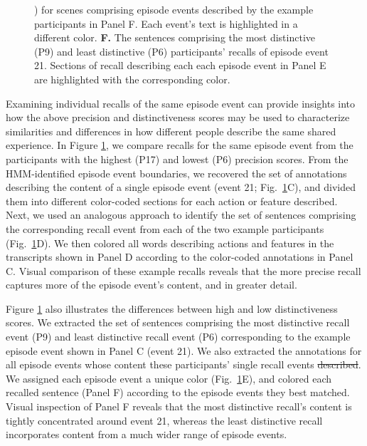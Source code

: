 \documentclass[10pt]{article}
\renewcommand{\includegraphics}[2][]{} %
\providecommand{\DIFaddtex}[1]{{\protect\color{blue}\uwave{#1}}} %
\providecommand{\DIFdeltex}[1]{{\protect\color{red}\sout{#1}}}                      %
\providecommand{\DIFaddbegin}{} %
\providecommand{\DIFaddend}{} %
\providecommand{\DIFdelbegin}{} %
\providecommand{\DIFdelend}{} %
\providecommand{\DIFaddFL}[1]{\DIFadd{#1}} %
\providecommand{\DIFaddbeginFL}{} %
\providecommand{\DIFaddendFL}{} %
\providecommand{\DIFdelendFL}{} %
\providecommand{\DIFadd}[1]{\texorpdfstring{\DIFaddtex{#1}}{#1}} %
\providecommand{\DIFdel}[1]{\texorpdfstring{\DIFdeltex{#1}}{}} %
\newcommand{\DIFscaledelfig}{0.5}
\newlength{\DIFdelgraphicswidth} %
\newlength{\DIFdelgraphicsheight} %
\newcommand{\DIFaddincludegraphics}[2][]{{\color{blue}\fbox{\DIFOincludegraphics[#1]{#2}}}} %
\newcommand{\DIFdelincludegraphics}[2][]{%
\sbox{\DIFdelgraphicsbox}{\DIFOincludegraphics[#1]{#2}}%
\settoboxwidth{\DIFdelgraphicswidth}{\DIFdelgraphicsbox} %
\settoboxtotalheight{\DIFdelgraphicsheight}{\DIFdelgraphicsbox} %
\scalebox{\DIFscaledelfig}{%
\parbox[b]{\DIFdelgraphicswidth}{\usebox{\DIFdelgraphicsbox}\\[-\baselineskip] \rule{\DIFdelgraphicswidth}{0em}}\llap{\resizebox{\DIFdelgraphicswidth}{\DIFdelgraphicsheight}{%
\setlength{\unitlength}{\DIFdelgraphicswidth}%
\begin{picture}(1,1)%
\thicklines\linethickness{2pt} %
{\color[rgb]{1,0,0}\put(0,0){\framebox(1,1){}}}%
{\color[rgb]{1,0,0}\put(0,0){\line( 1,1){1}}}%
{\color[rgb]{1,0,0}\put(0,1){\line(1,-1){1}}}%
\end{picture}%
}\hspace*{3pt}}} %
} %
\DeclareRobustCommand{\DIFaddbegin}{\DIFOaddbegin \let\includegraphics\DIFaddincludegraphics} %
\DeclareRobustCommand{\DIFaddend}{\DIFOaddend \let\includegraphics\DIFOincludegraphics} %
\DeclareRobustCommand{\DIFdelbegin}{\DIFOdelbegin \let\includegraphics\DIFdelincludegraphics} %
\DeclareRobustCommand{\DIFdelend}{\DIFOaddend \let\includegraphics\DIFOincludegraphics} %
\DeclareRobustCommand{\DIFaddbeginFL}{\DIFOaddbeginFL \let\includegraphics\DIFaddincludegraphics} %
\DeclareRobustCommand{\DIFaddendFL}{\DIFOaddendFL \let\includegraphics\DIFOincludegraphics} %
\DeclareRobustCommand{\DIFdelendFL}{\DIFOaddendFL \let\includegraphics\DIFOincludegraphics} %
\begin{document}
\begin{figure}
{{{\citealp{ChenEtal17}}\hspace{0pt}%
) }\DIFdelendFL \DIFaddbeginFL \DIFaddFL{~\mbox{%
\citep{ChenEtal17} }\hspace{0pt}%
}\DIFaddendFL for scenes comprising episode events described by the example participants in Panel F.  Each event's text is highlighted in a different color.  \textbf{F.} The sentences comprising the most distinctive (P9) and least distinctive (P6) participants' recalls of episode event 21.  Sections of recall describing each each episode event in Panel E are highlighted with the corresponding color.}
  \label{fig:precision-detail}

\end{figure}


Examining individual recalls of the same episode event can provide insights into how the above precision and distinctiveness scores may be used to characterize similarities and differences in how different people describe the same shared experience.  In Figure \ref{fig:precision-detail}, we compare recalls for the same episode event from the participants with the highest (P17) and lowest (P6) precision scores.  From the HMM-identified episode event boundaries, we recovered the set of annotations describing the content of a single episode event (event 21; Fig.~\ref{fig:precision-detail}C), and divided them into different color-coded sections for each action or feature described.  Next, we used an analogous approach to identify the set of sentences comprising the corresponding recall event from each of the two example participants (Fig.~\ref{fig:precision-detail}D).  We then colored all words describing actions and features in the transcripts shown in Panel D according to the color-coded annotations in Panel C.  Visual comparison of these example recalls reveals that the more precise recall captures more of the episode event's content, and in greater detail.

Figure \ref{fig:precision-detail} also illustrates the differences between high and low distinctiveness scores.  We extracted the set of sentences comprising the most distinctive recall event (P9) and least distinctive recall event (P6) corresponding to the example episode event shown in Panel C (event 21).  We also extracted the annotations for all episode events whose content these participants' single recall events \DIFdelbegin \DIFdel{described}\DIFdelend \DIFaddbegin \DIFadd{touched on}\DIFaddend .  We assigned each episode event a unique color (Fig.~\ref{fig:precision-detail}E), and colored each recalled sentence (Panel F) according to the episode events they best matched.  Visual inspection of Panel F reveals that the most distinctive recall's content is tightly concentrated around event 21, whereas the least distinctive recall incorporates content from a much wider range of episode events.
\end{document}
